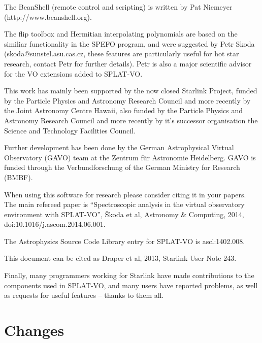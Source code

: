\documentclass[twoside,11pt]{article}
\newcommand{\htmladdnormallink}[2]{#1}
\renewcommand{\_}{\texttt{\symbol{95}}}
\newcommand{\SPLAT}{\textsf{SPLAT-VO}}
\begin{document}
The BeanShell (remote control and scripting) is written by Pat
Niemeyer (\htmladdnormallink{http://www.beanshell.org}
                            {http://www.beanshell.org}).

The flip toolbox and Hermitian interpolating polynomials are based on the
similiar functionality in the SPEFO program, and were suggested by Petr Skoda
(skoda@sunstel.asu.cas.cz, these features are particularly useful for hot star
research, contact Petr for further details). Petr is also a major scientific
advisor for the VO extensions added to \SPLAT.

This work has mainly been supported by the now closed
\htmladdnormallink{Starlink Project}{http://www.starlink.ac.uk},
funded by the
\htmladdnormallink{Particle Physics and Astronomy Research Council}{http://www.pparc.ac.uk}
and more recently by the
\htmladdnormallink{Joint Astronomy Centre Hawaii}{http://www.jach.hawaii.edu},
also funded by the
\htmladdnormallink{Particle Physics and Astronomy Research Council}{http://www.pparc.ac.uk}
and more recently by it's successor organisation the
\htmladdnormallink{Science and Technology Facilities Council}{http://www.scitech.ac.uk}.

Further development has been done by the 
\htmladdnormallink{German Astrophysical Virtual Observatory  (GAVO)} {http://www.g-vo.org} team at the 
\htmladdnormallink{Zentrum f\"ur Astronomie Heidelberg} {http://www.zah.uni-heidelberg.de}. 
GAVO is funded through the Verbundforschung of the German Ministry for Research (BMBF).

When using this software for research please consider citing it in your papers. The main
refereed paper is ``Spectroscopic analysis in the virtual observatory environment with SPLAT-VO'',
\v{S}koda et al, Astronomy \& Computing, 2014,
\htmladdnormallink{doi:10.1016/j.ascom.2014.06.001}{http://dx.doi.org/10.1016/j.ascom.2014.06.001}.

The Astrophysics Source Code Library entry for SPLAT-VO is \htmladdnormallink{ascl:1402.008}{http://ascl.net/1402.008}.

This document can be cited as Draper et al, 2013, Starlink User Note 243.

Finally, many programmers working for Starlink have made contributions to the
components used in \SPLAT, and many users have reported problems, as well as
requests for useful features -- thanks to them all.

\section{Changes}
\end{document}
